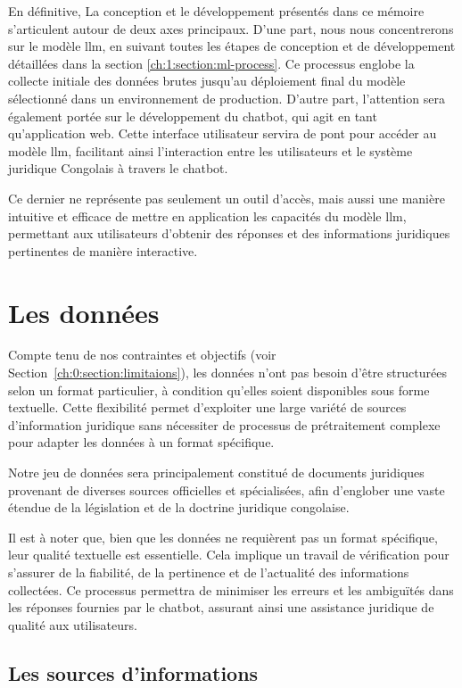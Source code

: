 En définitive, La conception et le développement présentés dans ce mémoire s'articulent autour de deux axes principaux. D'une part, nous nous concentrerons sur le modèle \ac{llm}, en suivant toutes les étapes de conception et de développement détaillées dans la section \ref{ch:1:section:ml-process}. Ce processus englobe la collecte initiale des données brutes jusqu'au déploiement final du modèle sélectionné dans un environnement de production. D'autre part, l'attention sera également portée sur le développement du chatbot, qui agit en tant qu'application web. Cette interface utilisateur servira de pont pour accéder au modèle \ac{llm}, facilitant ainsi l'interaction entre les utilisateurs et le système juridique Congolais à travers le chatbot. 

Ce dernier ne représente pas seulement un outil d'accès, mais aussi une manière intuitive et efficace de mettre en application les capacités du modèle \ac{llm}, permettant aux utilisateurs d'obtenir des réponses et des informations juridiques pertinentes de manière interactive.

\section{Les données}

Compte tenu de nos contraintes et objectifs (voir Section~\ref{ch:0:section:limitaions}), les données n'ont pas besoin d'être structurées selon un format particulier, à condition qu'elles soient disponibles sous forme textuelle. Cette flexibilité permet d'exploiter une large variété de sources d'information juridique sans nécessiter de processus de prétraitement complexe pour adapter les données à un format spécifique.

Notre jeu de données sera principalement constitué de documents juridiques provenant de diverses sources officielles et spécialisées, afin d'englober une vaste étendue de la législation et de la doctrine juridique congolaise.

Il est à noter que, bien que les données ne requièrent pas un format spécifique, leur qualité textuelle est essentielle. Cela implique un travail de vérification pour s'assurer de la fiabilité, de la pertinence et de l'actualité des informations collectées. Ce processus permettra de minimiser les erreurs et les ambiguïtés dans les réponses fournies par le chatbot, assurant ainsi une assistance juridique de qualité aux utilisateurs.

\subsection{Les sources d'informations}



